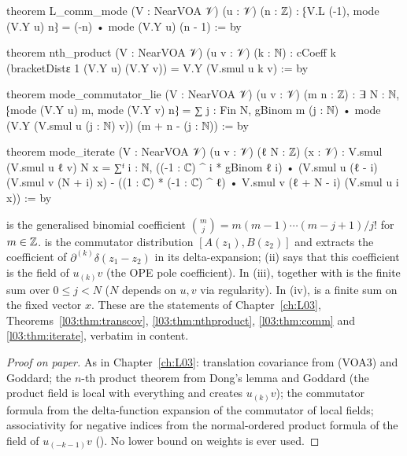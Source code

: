 \begin{leancode}
theorem L_comm_mode (V : NearVOA 𝒱) (u : 𝒱) (n : ℤ) :
    ⁅V.L (-1), mode (V.Y u) n⁆ = (-n) • mode (V.Y u) (n - 1) := by

theorem nth_product (V : NearVOA 𝒱) (u v : 𝒱) (k : ℕ) :
    cCoeff k (bracketDistε 1 (V.Y u) (V.Y v)) = V.Y (V.smul u k v) := by

theorem mode_commutator_lie (V : NearVOA 𝒱) (u v : 𝒱) (m n : ℤ) :
    ∃ N : ℕ, ⁅mode (V.Y u) m, mode (V.Y v) n⁆ =
      ∑ j : Fin N, gBinom m (j : ℕ) •
        mode (V.Y (V.smul u (j : ℕ) v)) (m + n - (j : ℕ)) := by

theorem mode_iterate (V : NearVOA 𝒱) (u v : 𝒱) (ℓ N : ℤ) (x : 𝒱) :
    V.smul (V.smul u ℓ v) N x
      = ∑ᶠ i : ℕ, ((-1 : ℂ) ^ i * gBinom ℓ i) •
          (V.smul u (ℓ - i) (V.smul v (N + i) x)
            - ((1 : ℂ) * (-1 : ℂ) ^ ℓ) • V.smul v (ℓ + N - i) (V.smul u i x)) := by
\end{leancode}

\begin{dictionary}
 is the generalised binomial coefficient $\binom mj=m(m-1)\cdots(m-j+1)/j!$ for $m\in{\mathbb{Z}}$.
 is the commutator distribution $[A(z_1),B(z_2)]$ and  extracts the coefficient of
$\partial^{(k)}\delta(z_1-z_2)$ in its delta-expansion; (ii) says that this coefficient is the field of $u_{(k)}v$ (the OPE pole
coefficient).  In (iii),  together with  is the finite sum over $0\le j<N$ ($N$ depends on
$u,v$ via regularity).  In (iv),  is a finite sum on the fixed vector $x$.  These are the statements of
Chapter~\ref{ch:L03}, Theorems~\ref{l03:thm:transcov}, \ref{l03:thm:nthproduct}, \ref{l03:thm:comm} and
\ref{l03:thm:iterate}, verbatim in content.
\end{dictionary}

\begin{proof}[Proof on paper]
As in Chapter~\ref{ch:L03}: translation covariance from (VOA3) and Goddard; the $n$-th product theorem from Dong's lemma
and Goddard (the product field is local with everything and creates $u_{(k)}v$); the commutator formula from the
delta-function expansion of the commutator of local fields; associativity for negative indices from the normal-ordered
product formula of the field of $u_{(-k-1)}v$ ().  No lower bound on weights is ever used.
\end{proof}

